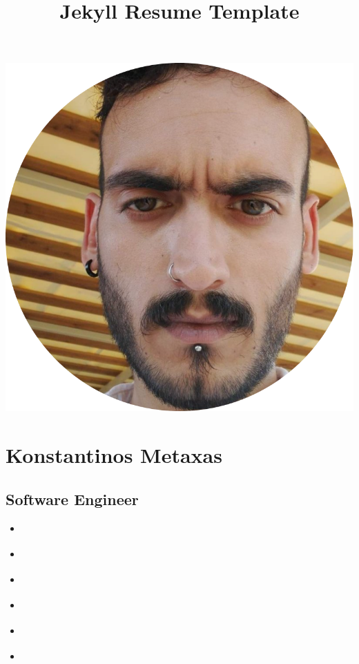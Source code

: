 \documentclass[
]{article}
\title{Jekyll Resume Template}
\author{}
\date{}
\providecommand{\tightlist}{%
  \setlength{\itemsep}{0pt}\setlength{\parskip}{0pt}}
\begin{document}
\maketitle

\includegraphics{images/cv.png}

\hypertarget{konstantinos-metaxas}{%
\section{Konstantinos Metaxas}\label{konstantinos-metaxas}}

\hypertarget{software-engineer}{%
\subsection{Software Engineer}\label{software-engineer}}

\begin{itemize}
\tightlist
\item
  \href{https://github.com/deadoralive1908/konstantinos-cv-jekyll-theme}{}
\item
  \href{http://twitter.com/km}{}
\item
  \href{https://medium.com/@km}{}
\item
  \href{https://dribbble.com/km}{}
\item
  \href{https://www.linkedin.com/in/km}{}
\item
  \href{http://joelglovier.com}{}
\end{itemize}
\end{document}
